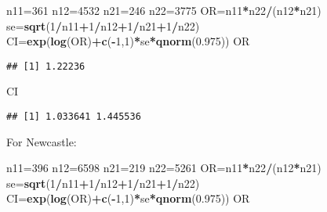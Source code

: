 \documentclass[]{article}
\newenvironment{Shaded}{\begin{snugshade}}{\end{snugshade}}
\newcommand{\KeywordTok}[1]{\textcolor[rgb]{0.13,0.29,0.53}{\textbf{#1}}}
\newcommand{\DecValTok}[1]{\textcolor[rgb]{0.00,0.00,0.81}{#1}}
\newcommand{\FloatTok}[1]{\textcolor[rgb]{0.00,0.00,0.81}{#1}}
\newcommand{\OperatorTok}[1]{\textcolor[rgb]{0.81,0.36,0.00}{\textbf{#1}}}
\newcommand{\NormalTok}[1]{#1}
\begin{document}
\begin{Shaded}
\begin{Highlighting}[]
\NormalTok{n11=}\DecValTok{361}
\NormalTok{n12=}\DecValTok{4532}
\NormalTok{n21=}\DecValTok{246}
\NormalTok{n22=}\DecValTok{3775}
\NormalTok{OR=n11}\OperatorTok{*}\NormalTok{n22}\OperatorTok{/}\NormalTok{(n12}\OperatorTok{*}\NormalTok{n21)}
\NormalTok{se=}\KeywordTok{sqrt}\NormalTok{(}\DecValTok{1}\OperatorTok{/}\NormalTok{n11}\OperatorTok{+}\DecValTok{1}\OperatorTok{/}\NormalTok{n12}\OperatorTok{+}\DecValTok{1}\OperatorTok{/}\NormalTok{n21}\OperatorTok{+}\DecValTok{1}\OperatorTok{/}\NormalTok{n22)}
\NormalTok{CI=}\KeywordTok{exp}\NormalTok{(}\KeywordTok{log}\NormalTok{(OR)}\OperatorTok{+}\KeywordTok{c}\NormalTok{(}\OperatorTok{-}\DecValTok{1}\NormalTok{,}\DecValTok{1}\NormalTok{)}\OperatorTok{*}\NormalTok{se}\OperatorTok{*}\KeywordTok{qnorm}\NormalTok{(}\FloatTok{0.975}\NormalTok{))}
\NormalTok{OR}
\end{Highlighting}
\end{Shaded}

\begin{verbatim}
## [1] 1.22236
\end{verbatim}

\begin{Shaded}
\begin{Highlighting}[]
\NormalTok{CI}
\end{Highlighting}
\end{Shaded}

\begin{verbatim}
## [1] 1.033641 1.445536
\end{verbatim}

For Newcastle:

\begin{Shaded}
\begin{Highlighting}[]
\NormalTok{n11=}\DecValTok{396}
\NormalTok{n12=}\DecValTok{6598}
\NormalTok{n21=}\DecValTok{219}
\NormalTok{n22=}\DecValTok{5261}
\NormalTok{OR=n11}\OperatorTok{*}\NormalTok{n22}\OperatorTok{/}\NormalTok{(n12}\OperatorTok{*}\NormalTok{n21)}
\NormalTok{se=}\KeywordTok{sqrt}\NormalTok{(}\DecValTok{1}\OperatorTok{/}\NormalTok{n11}\OperatorTok{+}\DecValTok{1}\OperatorTok{/}\NormalTok{n12}\OperatorTok{+}\DecValTok{1}\OperatorTok{/}\NormalTok{n21}\OperatorTok{+}\DecValTok{1}\OperatorTok{/}\NormalTok{n22)}
\NormalTok{CI=}\KeywordTok{exp}\NormalTok{(}\KeywordTok{log}\NormalTok{(OR)}\OperatorTok{+}\KeywordTok{c}\NormalTok{(}\OperatorTok{-}\DecValTok{1}\NormalTok{,}\DecValTok{1}\NormalTok{)}\OperatorTok{*}\NormalTok{se}\OperatorTok{*}\KeywordTok{qnorm}\NormalTok{(}\FloatTok{0.975}\NormalTok{))}
\NormalTok{OR}
\end{Highlighting}
\end{Shaded}
\end{document}
